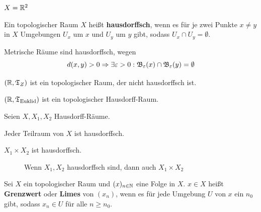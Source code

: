 \begin{beispiel}
    $X = \mathbb{R}^2$ 

    
\end{beispiel}

\begin{definition}%
    Ein topologischer Raum $X$ heißt \textbf{hausdorffsch}, wenn es
    für je zwei Punkte $x \neq y$ in $X$ Umgebungen $U_x$ um $x$
    und $U_y$ um $y$ gibt, sodass $U_x \cap U_y = \emptyset$.
\end{definition}

\begin{bemerkung}[Trennungseigenschaft]\label{Trennungseigenschaft}
    Metrische Räume sind hausdorffsch, wegen 
    \[d(x, y) > 0 \Rightarrow \exists \varepsilon > 0: \mathfrak{B}_\varepsilon(x) \cap \mathfrak{B}_\varepsilon(y) = \emptyset\]
\end{bemerkung}

\begin{beispiel}
    \begin{bspenum}
        \item $(\mathbb{R}, \mathfrak{T}_Z)$ ist ein topologischer Raum, der nicht hausdorffsch ist.
        \item $(\mathbb{R}, \mathfrak{T}_{\textnormal{Euklid}})$ ist ein topologischer Hausdorff-Raum.
    \end{bspenum}
\end{beispiel}

\begin{bemerkung}
    Seien $X, X_1, X_2$ Hausdorff-Räume.
    \begin{bemenum}
        \item Jeder Teilraum von $X$ ist hausdorffsch.
        \item $X_1 \times X_2$ ist hausdorffsch.
    \end{bemenum}
    \begin{figure}[htp]
        \centering
        
        \caption{Wenn $X_1, X_2$ hausdorffsch sind, dann auch $X_1 \times X_2$}
    \end{figure}
\end{bemerkung}

\begin{definition}%
    Sei $X$ ein topologischer Raum und $(x)_{n \in \mathbb{N}}$ eine Folge
    in $X$. $x \in X$ heißt \textbf{Grenzwert} oder \textbf{Limes}
    von $(x_n)$, wenn es für jede Umgebung $U$ von $x$ ein $n_0$ gibt,
    sodass $x_n \in U$ für alle $n \geq n_0$.
\end{definition}

